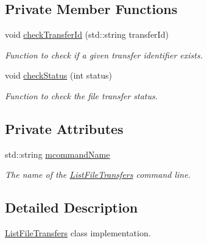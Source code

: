 \subsection*{Private Member Functions}
\begin{DoxyCompactItemize}
\item 
void \hyperlink{classListFileTransfers_adb9c1301e69d043d53418e339458a388}{checkTransferId} (std::string transferId)
\begin{DoxyCompactList}\small\item\em Function to check if a given transfer identifier exists. \item\end{DoxyCompactList}\item 
void \hyperlink{classListFileTransfers_ae10c9dc107c719e7129b12245de7b5f8}{checkStatus} (int status)
\begin{DoxyCompactList}\small\item\em Function to check the file transfer status. \item\end{DoxyCompactList}\end{DoxyCompactItemize}
\subsection*{Private Attributes}
\begin{DoxyCompactItemize}
\item 
\hypertarget{classListFileTransfers_a1e0408c71b436b348c6c0c95aef7f804}{
std::string \hyperlink{classListFileTransfers_a1e0408c71b436b348c6c0c95aef7f804}{mcommandName}}
\label{classListFileTransfers_a1e0408c71b436b348c6c0c95aef7f804}

\begin{DoxyCompactList}\small\item\em The name of the \hyperlink{classListFileTransfers}{ListFileTransfers} command line. \item\end{DoxyCompactList}\end{DoxyCompactItemize}


\subsection{Detailed Description}
\hyperlink{classListFileTransfers}{ListFileTransfers} class implementation. 

